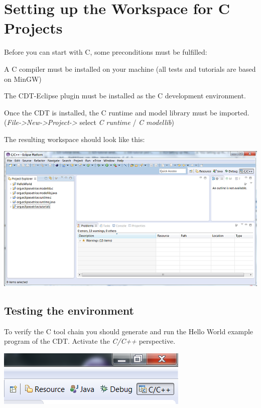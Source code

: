 \chapter{Setting up the Workspace for C Projects}
 
Before you can start with C, some preconditions must be fulfilled:

\begin{description}
\item{A C compiler} must be installed on your machine (all tests and tutorials are based on MinGW)
\item{The CDT-Eclipse plugin} must be installed as the C development environment.
\end{description}

Once the CDT is installed, the C runtime and model library must be imported. 
(\textit{File->New->Project->\eTrice{}} select \textit{\eTrice{} C runtime} / \textit{\eTrice{} C modellib})

The resulting workspace should look like this:

\includegraphics{images/032-SetupWorkspaceC01.png}


\section{Testing the environment}

To verify the C tool chain you should generate and run the Hello World example program of the CDT. 
Activate the \textit{C/C++} perspective. 

\includegraphics{images/032-SetupWorkspaceC03.png} 
 
